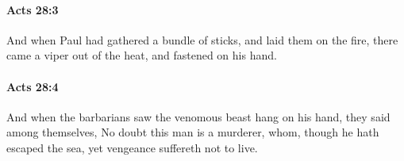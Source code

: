 		\paragraph{Acts 28:3} %
			\label{ACTS-28-3}

			And when Paul had gathered a bundle of sticks, and laid them on the fire, there came a viper out of the heat, and fastened on his hand.

			\begin{framed}
			\scriptsize
				\begin{compactdesc}
					\item[SBLG] 
				\end{compactdesc}
			\end{framed}

		\paragraph{Acts 28:4} %
			\label{ACTS-28-4}

			And when the barbarians saw the venomous beast hang on his hand, they said among themselves, No doubt this man is a murderer, whom, though he hath escaped the sea, yet vengeance suffereth not to live.

